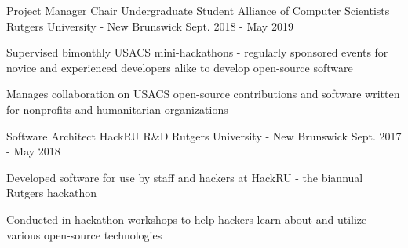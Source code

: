 


\begin{cventries}
  \cventry
  {Project Manager Chair} %
  {Undergraduate Student Alliance of Computer Scientists} %
  {Rutgers University - New Brunswick} %
  {Sept. 2018 - May 2019} %
  { %
    \begin{cvitems}
    \item {Supervised bimonthly USACS mini-hackathons - regularly sponsored events for novice and experienced developers alike to develop open-source software}
    \item {Manages collaboration on USACS open-source contributions and software written for nonprofits and humanitarian organizations}
    \end{cvitems}
  }

  \cventry
  {Software Architect} %
  {HackRU R\&D} %
  {Rutgers University - New Brunswick} %
  {Sept. 2017 - May 2018} %
  { %
    \begin{cvitems}
    \item {Developed software for use by staff and hackers at HackRU - the biannual Rutgers hackathon}
    \item {Conducted in-hackathon workshops to help hackers learn about and utilize various open-source technologies}
    \end{cvitems}
  }
\end{cventries}
